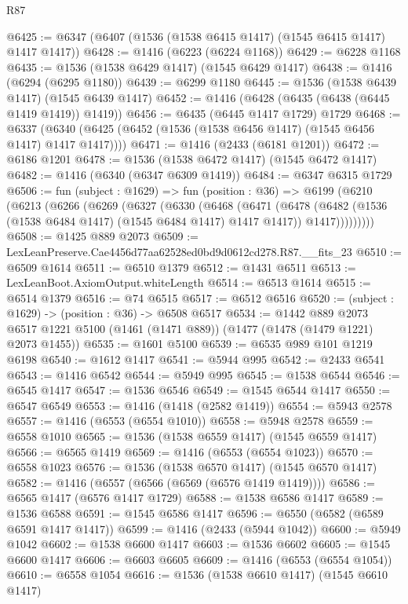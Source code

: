 \begin{lexlean}{R87}
\begin{coremodule}
{{@6425 := @6347 (@6407 (@1536 (@1538 @6415 @1417) (@1545 @6415 @1417) @1417 @1417))
@6428 := @1416 (@6223 (@6224 @1168))
@6429 := @6228 @1168
@6435 := @1536 (@1538 @6429 @1417) (@1545 @6429 @1417)
@6438 := @1416 (@6294 (@6295 @1180))
@6439 := @6299 @1180
@6445 := @1536 (@1538 @6439 @1417) (@1545 @6439 @1417)
@6452 := @1416 (@6428 (@6435 (@6438 (@6445 @1419 @1419)) @1419))
@6456 := @6435 (@6445 @1417 @1729) @1729
@6468 := @6337 (@6340 (@6425 (@6452 (@1536 (@1538 @6456 @1417) (@1545 @6456 @1417) @1417 @1417))))
@6471 := @1416 (@2433 (@6181 @1201))
@6472 := @6186 @1201
@6478 := @1536 (@1538 @6472 @1417) (@1545 @6472 @1417)
@6482 := @1416 (@6340 (@6347 @6309 @1419))
@6484 := @6347 @6315 @1729
@6506 := fun (subject : @1629) =>
  fun (position : @36) =>
  @6199
    (@6210
      (@6213
        (@6266
          (@6269
            (@6327
              (@6330
                (@6468
                  (@6471
                    (@6478
                      (@6482 (@1536 (@1538 @6484 @1417) (@1545 @6484 @1417) @1417 @1417))
                      @1417)))))))))
@6508 := @1425 @889 @2073
@6509 := LexLeanPreserve.Cae4456d77aa62528ed0bd9d0612cd278.R87.__fits_23
@6510 := @6509 @1614
@6511 := @6510 @1379
@6512 := @1431 @6511
@6513 := LexLeanBoot.AxiomOutput.whiteLength
@6514 := @6513 @1614
@6515 := @6514 @1379
@6516 := @74 @6515
@6517 := @6512 @6516
@6520 := (subject : @1629) -> (position : @36) -> @6508 @6517
@6534 := @1442
    @889
    @2073
    @6517
    @1221
    @5100
    (@1461 (@1471 @889))
    (@1477 (@1478 (@1479 @1221) @2073 @1455))
@6535 := @1601 @5100
@6539 := @6535 @989 @101 @1219 @6198
@6540 := @1612 @1417
@6541 := @5944 @995
@6542 := @2433 @6541
@6543 := @1416 @6542
@6544 := @5949 @995
@6545 := @1538 @6544
@6546 := @6545 @1417
@6547 := @1536 @6546
@6549 := @1545 @6544 @1417
@6550 := @6547 @6549
@6553 := @1416 (@1418 (@2582 @1419))
@6554 := @5943 @2578
@6557 := @1416 (@6553 (@6554 @1010))
@6558 := @5948 @2578
@6559 := @6558 @1010
@6565 := @1536 (@1538 @6559 @1417) (@1545 @6559 @1417)
@6566 := @6565 @1419
@6569 := @1416 (@6553 (@6554 @1023))
@6570 := @6558 @1023
@6576 := @1536 (@1538 @6570 @1417) (@1545 @6570 @1417)
@6582 := @1416 (@6557 (@6566 (@6569 (@6576 @1419 @1419))))
@6586 := @6565 @1417 (@6576 @1417 @1729)
@6588 := @1538 @6586 @1417
@6589 := @1536 @6588
@6591 := @1545 @6586 @1417
@6596 := @6550 (@6582 (@6589 @6591 @1417 @1417))
@6599 := @1416 (@2433 (@5944 @1042))
@6600 := @5949 @1042
@6602 := @1538 @6600 @1417
@6603 := @1536 @6602
@6605 := @1545 @6600 @1417
@6606 := @6603 @6605
@6609 := @1416 (@6553 (@6554 @1054))
@6610 := @6558 @1054
@6616 := @1536 (@1538 @6610 @1417) (@1545 @6610 @1417)
}}
\end{coremodule}
\end{lexlean}
